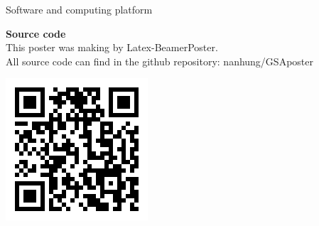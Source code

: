 \documentclass[xcolor=table]{beamer}
\begin{document}
\begin{frame}[t]
\begin{columns}[t]
\begin{column}{0.25\paperwidth}
\begin{alertblock}{Software and computing platform}
\vspace{10mm} %

\noindent\begin{minipage}{0.85\textwidth}%
\textbf{Source code}\\
\small{This poster was making by Latex-BeamerPoster.}\\
\small{All source code can find in the github repository: nanhung/GSAposter}\\
\end{minipage}%
\hfill%
\begin{minipage}{0.1\textwidth}
\includegraphics[width=1\linewidth]{QR}
\end{minipage}

\end{alertblock}

\end{column} %


\begin{column}{0.23\paperwidth} %


\end{column}
\end{columns}
\end{frame}
\end{document}

